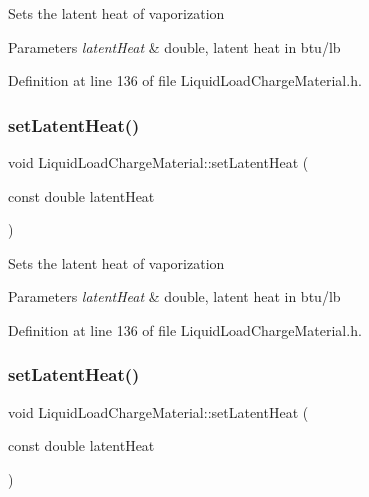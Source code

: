 Sets the latent heat of vaporization 
\begin{DoxyParams}{Parameters}
{\em latent\+Heat} & double, latent heat in btu/lb \\
\hline
\end{DoxyParams}


Definition at line 136 of file Liquid\+Load\+Charge\+Material.\+h.

\mbox{\label{class_liquid_load_charge_material_a01d2d23580f27aa9e5cba1124635a677}} 
\subsubsection{\texorpdfstring{set\+Latent\+Heat()}{setLatentHeat()}\hspace{0.1cm}{\footnotesize\ttfamily [2/3]}}
{\footnotesize\ttfamily void Liquid\+Load\+Charge\+Material\+::set\+Latent\+Heat (\begin{DoxyParamCaption}\item[{const double}]{latent\+Heat }\end{DoxyParamCaption})\hspace{0.3cm}{\ttfamily [inline]}}

Sets the latent heat of vaporization 
\begin{DoxyParams}{Parameters}
{\em latent\+Heat} & double, latent heat in btu/lb \\
\hline
\end{DoxyParams}


Definition at line 136 of file Liquid\+Load\+Charge\+Material.\+h.

\mbox{\label{class_liquid_load_charge_material_a01d2d23580f27aa9e5cba1124635a677}} 
\subsubsection{\texorpdfstring{set\+Latent\+Heat()}{setLatentHeat()}\hspace{0.1cm}{\footnotesize\ttfamily [3/3]}}
{\footnotesize\ttfamily void Liquid\+Load\+Charge\+Material\+::set\+Latent\+Heat (\begin{DoxyParamCaption}\item[{const double}]{latent\+Heat }\end{DoxyParamCaption})\hspace{0.3cm}{\ttfamily [inline]}}

